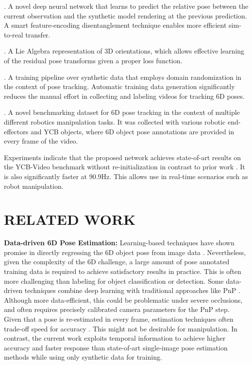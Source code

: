 \documentclass[letterpaper, 10 pt, conference]{ieeeconf}
\begin{document}
. A novel deep neural network that learns to predict the relative pose between the current observation and the synthetic model rendering at
the previous prediction. A smart feature-encoding disentanglement technique enables more efficient sim-to-real transfer.

. A Lie Algebra representation of 3D orientations, which allows effective learning of the residual pose transforms given a proper loss function. 

. A training pipeline over synthetic data that employs 
domain randomization \cite{tobin2017domain} in the context of pose tracking. Automatic training data generation significantly reduces the manual effort in collecting and labeling videos for tracking 6D poses.

. A novel benchmarking dataset for 6D pose tracking in the context of multiple different robotics manipulation tasks. It was collected with various robotic end-effectors and YCB objects, where 6D object pose annotations are provided in every frame of the video.

Experiments indicate that the proposed network achieves state-of-art
results on the YCB-Video benchmark without re-initialization in contrast to prior work \cite{li2018deepim,deng2019poserbpf}. It is also significantly
faster at 90.9Hz. This allows use in real-time scenarios such as robot manipulation.


 


\section{RELATED WORK}
\noindent \textbf{Data-driven 6D Pose Estimation:} Learning-based techniques have shown promise in directly regressing the 6D object pose from image data \cite{xiang2017posecnn,
  wang2019densefusion}. Nevertheless, given the complexity of the 6D
challenge, a large amount of pose annotated training data is required
to achieve satisfactory results in practice. This is often more
challenging than labeling for object classification or detection. Some
data-driven techniques combine deep learning with traditional
approaches like PnP \cite{tremblay2018deep}. Although
more data-efficient, this could be problematic under severe
occlusions, and often requires precisely calibrated camera parameters
for the PnP step. Given that a pose is re-estimated in every frame,
estimation techniques often trade-off speed for accuracy
\cite{xiang2017posecnn}. This might not be
desirable for manipulation. In contrast, the current work exploits
temporal information to achieve higher accuracy and faster response than 
state-of-art single-image pose estimation methods while using only synthetic data for training.
\end{document}
